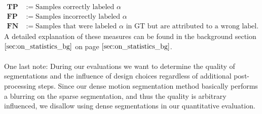 \begin{equation}
\begin{aligned}
	\textbf{TP} &:= \text{Samples correctly labeled $\alpha$} \\
	\textbf{FP} &:= \text{Samples incorrectly labeled $\alpha$} \\
	\textbf{FN} &:= \text{Samples that were labeled $\alpha$ in GT but are attributed to a wrong label.}
\end{aligned}
\label{eq:statistical_counts}
\end{equation}
A detailed explanation of these measures can be found in the background section $\ref{sec:on_statistics_bg}$ on page $\pageref{sec:on_statistics_bg}$. \\ \\
One last note: During our evaluations we want to determine the quality of segmentations and the influence of design choices regardless of additional post-processing steps. Since our dense motion segmentation method basically performs a blurring on the sparse segmentation, and thus the quality is arbitrary influenced, we disallow using dense segmentations in our quantitative evaluation.

